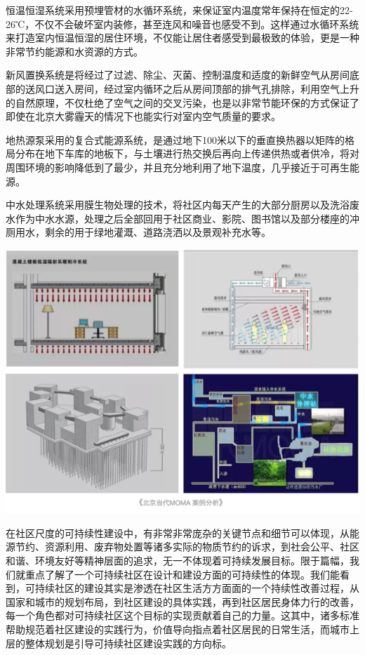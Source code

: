 \documentclass[
]{book}
\begin{document}
恒温恒湿系统采用预埋管材的水循环系统，来保证室内温度常年保持在恒定的22-26℃，不仅不会破坏室内装修，甚至连风和噪音也感受不到。这样通过水循环系统来打造室内恒温恒湿的居住环境，不仅能让居住者感受到最极致的体验，更是一种非常节约能源和水资源的方式。

新风置换系统是将经过了过滤、除尘、灭菌、控制温度和适度的新鲜空气从房间底部的送风口送入房间，经过室内循环之后从房间顶部的排气孔排除，利用空气上升的自然原理，不仅杜绝了空气之间的交叉污染，也是以非常节能环保的方式保证了即使在北京大雾霾天的情况下也能实行对室内空气质量的要求。

地热源泵采用的复合式能源系统，是通过地下100米以下的垂直换热器以矩阵的格局分布在地下车库的地板下，与土壤进行热交换后再向上传递供热或者供冷，将对周围环境的影响降低到了最少，并且充分地利用了地下温度，几乎接近于可再生能源。

中水处理系统采用膜生物处理的技术，将社区内每天产生的大部分厨房以及洗浴废水作为中水水源，处理之后全部回用于社区商业、影院、图书馆以及部分楼座的冲厕用水，剩余的用于绿地灌溉、道路浇洒以及景观补充水等。

\includegraphics[width=8.33in]{images/moma6}

在社区尺度的可持续性建设中，有非常非常庞杂的关键节点和细节可以体现，从能源节约、资源利用、废弃物处置等诸多实际的物质节约的诉求，到社会公平、社区和谐、环境友好等精神层面的追求，无一不体现着可持续发展目标。限于篇幅，我们就重点了解了一个可持续社区在设计和建设方面的可持续性的体现。我们能看到，可持续社区的建设其实是渗透在社区生活方方面面的一个持续性改善过程，从国家和城市的规划布局，到社区建设的具体实践，再到社区居民身体力行的改善，每一个角色都对可持续社区这个目标的实现贡献着自己的力量。这其中，诸多标准帮助规范着社区建设的实践行为，价值导向指点着社区居民的日常生活，而城市上层的整体规划是引导可持续社区建设实践的方向标。
\end{document}
